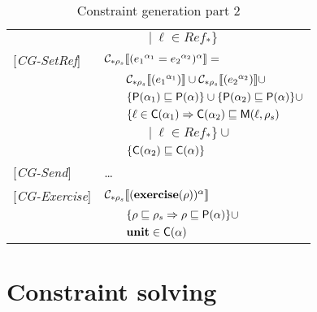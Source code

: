 \begin{table}[hbt]
\begin{tabular} {l l l l}
&&&$|\ \ell \in Ref_*\}$\\
{[\textit{CG-SetRef}]}&\multicolumn{3}{l}{$\mathcal{C}_{*\rho_s}\llbracket ({e_1}^{\alpha_1} = {e_2}^{\alpha_2})^\alpha \rrbracket = $}\\
&&\multicolumn{2}{l}{$ \mathcal{C}_{*\rho_s}\llbracket ({e_1}^{\alpha_1}) \rrbracket \cup \mathcal{C}_{*\rho_s}\llbracket ({e_2}^{\alpha_2}) \rrbracket \cup $}\\
&&\multicolumn{2}{l}{$ \{ \mathsf{P}(\alpha_1) \sqsubseteq \mathsf{P}(\alpha) \} \cup \{ \mathsf{P}(\alpha_2) \sqsubseteq \mathsf{P}(\alpha) \} \cup $}\\
&&\multicolumn{2}{l}{$\{\ell \in \mathsf{C}(\alpha_1) \Rightarrow \mathsf{C}(\alpha_2) \sqsubseteq \mathsf{M}(\ell, \rho_s)$}\\
&&&$|\ \ell \in Ref_*\}\cup$ \\
&&\multicolumn{2}{l}{$\{ \mathsf{C}(\alpha_2) \sqsubseteq \mathsf{C}(\alpha) \}$} \\
{[\textit{CG-Send}]}& \dots \\
{[\textit{CG-Exercise}]}& \multicolumn{3}{l}{$\mathcal{C}_{*\rho_s}\llbracket (\mathbf{exercise}(\rho))^\alpha \rrbracket $}\\
&&\multicolumn{2}{l}{$ \{ \rho \sqsubseteq \rho_s \Rightarrow \rho \sqsubseteq \mathsf{P}(\alpha) \} \cup $}\\
&&\multicolumn{2}{l}{$ \mathbf{unit} \in \mathsf{C}(\alpha)$}\\
\end{tabular}
\caption{Constraint generation part 2}
\label{tab:ConstGen2}
\end{table}

\section{Constraint solving}
\label{sec:ConstraintSolving}

